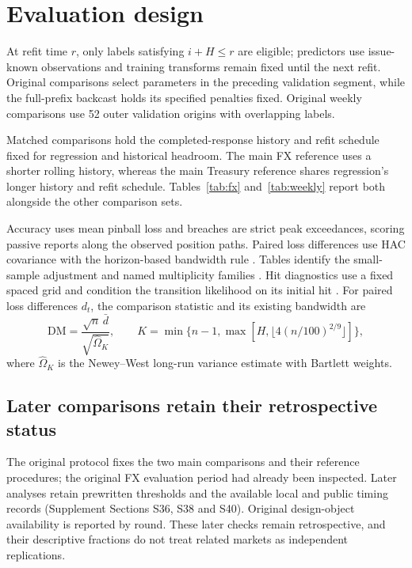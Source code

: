 \documentclass[11pt,a4paper]{article}
\begin{document}
\FloatBarrier

\section{Evaluation design}\label{sec:evaluation}

At refit time \(r\), only labels satisfying \(i+H\le r\) are eligible; predictors use issue-known observations and training transforms remain fixed until the next refit. Original comparisons select parameters in the preceding validation segment, while the full-prefix backcast holds its specified penalties fixed. Original weekly comparisons use 52 outer validation origins with overlapping labels.

Matched comparisons hold the completed-response history and refit schedule fixed for regression and historical headroom. The main FX reference uses a shorter rolling history, whereas the main Treasury reference shares regression's longer history and refit schedule. Tables~\ref{tab:fx} and~\ref{tab:weekly} report both alongside the other comparison sets.

Accuracy uses mean pinball loss and breaches are strict peak exceedances, scoring passive reports along the observed position paths. Paired loss differences use HAC covariance with the horizon-based bandwidth rule \citep{dm1995,nw1987}. Tables identify the small-sample adjustment and named multiplicity families \citep{hln1997,holm1979}. Hit diagnostics use a fixed spaced grid and condition the transition likelihood on its initial hit \citep{kupiec1995,christ1998}.
For paired loss differences \(d_t\), the comparison statistic and its existing bandwidth are
\[
\mathrm{DM}=\frac{\sqrt n\,\bar d}{\sqrt{\widehat\Omega_K}},\qquad
K=\min\{n-1,\max[H,\lfloor4(n/100)^{2/9}\rfloor]\},
\]
where \(\widehat\Omega_K\) is the Newey--West long-run variance estimate with Bartlett weights.


\subsection{Later comparisons retain their retrospective status}

The original protocol fixes the two main comparisons and their reference procedures; the original FX evaluation period had already been inspected. Later analyses retain prewritten thresholds and the available local and public timing records (Supplement Sections S36, S38 and S40). Original design-object availability is reported by round. These later checks remain retrospective, and their descriptive fractions do not treat related markets as independent replications.
\end{document}

